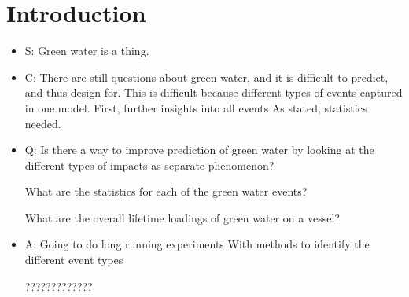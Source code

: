 \chapter{Introduction}
\begin{itemize}
	\item S:
	Green water is a thing.
	
	\item C:
	There are still questions about green water, and it is difficult to predict, and thus design for. 
	This is difficult because different types of events captured in one model.
	First, further insights into all events
	As stated, statistics needed.
	
	\item Q:
	Is there a way to improve prediction of green water by looking at the different types of impacts as separate phenomenon?
	
	What are the statistics for each of the green water events?
	
	What are the overall lifetime loadings of green water on a vessel?
	
	
	\item A:
	Going to do long running experiments
	With methods to identify the different event types
	
	?????????????
\end{itemize}
 
